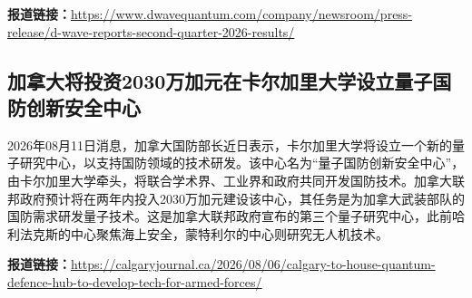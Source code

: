 \documentclass[12pt,a4paper]{ctexart}
\begin{document}
\noindent\textbf{报道链接：}\url{https://www.dwavequantum.com/company/newsroom/press-release/d-wave-reports-second-quarter-2026-results/}

\subsection{ 加拿大将投资2030万加元在卡尔加里大学设立量子国防创新安全中心 }

2026年08月11日消息，加拿大国防部长近日表示，卡尔加里大学将设立一个新的量子研究中心，以支持国防领域的技术研发。该中心名为“量子国防创新安全中心”，由卡尔加里大学牵头，将联合学术界、工业界和政府共同开发国防技术。加拿大联邦政府预计将在两年内投入2030万加元建设该中心，其任务是为加拿大武装部队的国防需求研发量子技术。这是加拿大联邦政府宣布的第三个量子研究中心，此前哈利法克斯的中心聚焦海上安全，蒙特利尔的中心则研究无人机技术。

\noindent\textbf{报道链接：}\url{https://calgaryjournal.ca/2026/08/06/calgary-to-house-quantum-defence-hub-to-develop-tech-for-armed-forces/}
\end{document}
